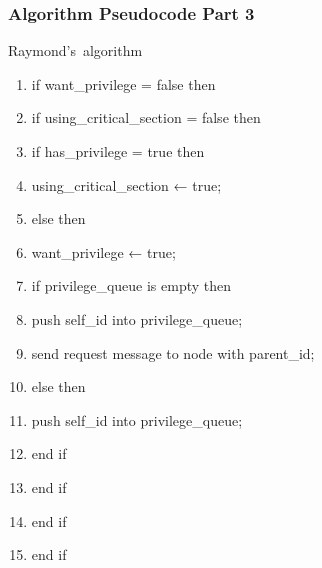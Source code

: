 \documentclass[11pt]{beamer}              %
\begin{document}
\begin{frame}
\frametitle{Algorithm Pseudocode Part 3}

\begin{center}
\begin{algorithm}[H]
	\scriptsize
	\def\algorithmlabel{Raymond's}
    \caption{\algorithmlabel\ algorithm}
    \label{alg:raymondsalgorithm}
    \begin{algorithmic}[1]
            \begin{enumerate}
                 \item if want\_privilege = false then
                \item \quad if using\_critical\_section = false then
                \item \quad \quad if has\_privilege = true then
                \item \quad \quad \quad using\_critical\_section ← true;
                \item \quad \quad else then
                \item \quad \quad \quad want\_privilege ← true;
                \item \quad \quad \quad if privilege\_queue is empty then
                \item \quad \quad \quad \quad push self\_id into privilege\_queue;
                \item \quad \quad \quad \quad send request message to node with parent\_id;
                \item \quad \quad \quad else then
                \item \quad \quad \quad \quad push self\_id into privilege\_queue;
                \item \quad \quad \quad end if
                \item \quad \quad end if
                \item \quad end if
                \item end if
            \end{enumerate}
    \end{algorithmic}
\end{algorithm}
\end{center}
\end{frame}
\end{document}
